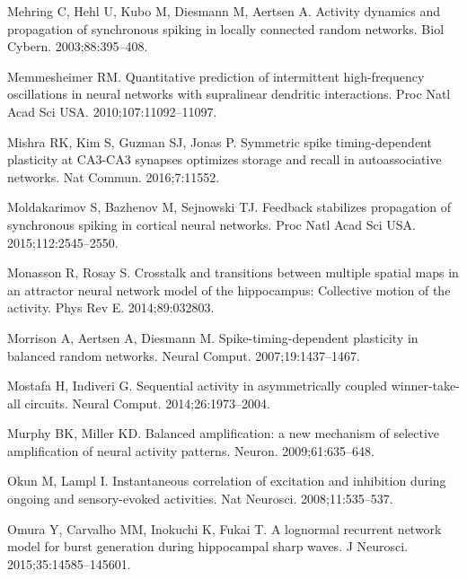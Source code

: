 \begin{thebibliography}{}
Mehring C, Hehl U, Kubo M, Diesmann M, Aertsen A.
\newblock Activity dynamics and propagation of synchronous spiking in locally
  connected random networks.
\newblock Biol Cybern. 2003;88:395--408.

Memmesheimer RM.
\newblock Quantitative prediction of intermittent high-frequency oscillations in neural networks with supralinear dendritic interactions.
\newblock Proc Natl Acad Sci USA. 2010;107:11092--11097.

Mishra RK, Kim S, Guzman SJ, Jonas P.
\newblock Symmetric spike timing-dependent plasticity at CA3-CA3 synapses optimizes storage and recall in autoassociative networks.
\newblock Nat Commun. 2016;7:11552.

Moldakarimov S, Bazhenov M, Sejnowski TJ.
\newblock Feedback stabilizes propagation of synchronous spiking in cortical neural networks.
\newblock Proc Natl Acad Sci USA. 2015;112:2545--2550.

Monasson R, Rosay S. 
\newblock Crosstalk and transitions between multiple spatial maps in an attractor neural network model of the hippocampus: Collective motion of the activity.
\newblock Phys Rev E. 2014;89:032803.

Morrison A, Aertsen A, Diesmann M.
\newblock Spike-timing-dependent plasticity in balanced random networks.
\newblock Neural Comput. 2007;19:1437--1467.

Mostafa H, Indiveri G.
\newblock Sequential activity in asymmetrically coupled winner-take-all circuits.
\newblock Neural Comput. 2014;26:1973--2004.

Murphy BK, Miller KD.
\newblock Balanced amplification: a new mechanism of selective amplification of
  neural activity patterns.
\newblock Neuron. 2009;61:635--648.


Okun M, Lampl I.
\newblock Instantaneous correlation of excitation and inhibition during ongoing
  and sensory-evoked activities.
\newblock Nat Neurosci. 2008;11:535--537.

Omura Y, Carvalho MM, Inokuchi K, Fukai T.
\newblock A lognormal recurrent network model for burst generation during hippocampal sharp waves.
\newblock J Neurosci. 2015;35:14585--145601.


\end{thebibliography}
